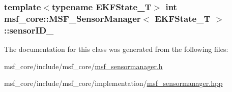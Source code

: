 \hypertarget{classmsf__core_1_1MSF__SensorManager_aacf4e41e98ee0b2cc366cdd725a7ae69}{
\subsubsection[{sensor\-I\-D\-\_\-}]{\setlength{\rightskip}{0pt plus 5cm}template$<$typename E\-K\-F\-State\-\_\-\-T$>$ int {\bf msf\-\_\-core\-::\-M\-S\-F\-\_\-\-Sensor\-Manager}$<$ E\-K\-F\-State\-\_\-\-T $>$\-::sensor\-I\-D\-\_\-\hspace{0.3cm}{\ttfamily [private]}}}\label{classmsf__core_1_1MSF__SensorManager_aacf4e41e98ee0b2cc366cdd725a7ae69}


The documentation for this class was generated from the following files\-:\begin{DoxyCompactItemize}
\item 
msf\-\_\-core/include/msf\-\_\-core/\hyperlink{msf__sensormanager_8h}{msf\-\_\-sensormanager.\-h}\item 
msf\-\_\-core/include/msf\-\_\-core/implementation/\hyperlink{msf__sensormanager_8hpp}{msf\-\_\-sensormanager.\-hpp}\end{DoxyCompactItemize}
